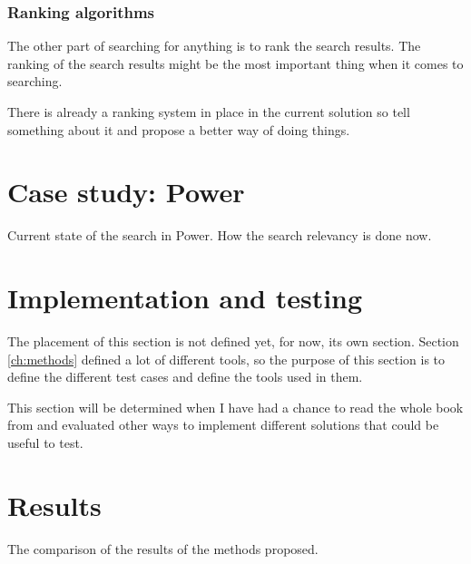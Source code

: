 \subsection{Ranking algorithms}
The other part of searching for anything is to rank the search results.
The ranking of the search results might be the most important thing when it comes to searching.

\todo{}
There is already a ranking system in place in the current solution so tell something about it and propose a better way of doing things.


\chapter{Case study: Power}
Current state of the search in Power.
How the search relevancy is done now.




\chapter{Implementation and testing}
\label{ch:testmethods}
The placement of this section is not defined yet, for now, its own section.
Section \ref{ch:methods} defined a lot of different tools, so the purpose of this section is to define the different test cases and define the tools used in them.

This section will be determined when I have had a chance to read the whole book from \citeauthor{relevantSearch} \cite{relevantSearch} and 
evaluated other ways to implement different solutions that could be useful to test.


\chapter{Results}

The comparison of the results of the methods proposed.


